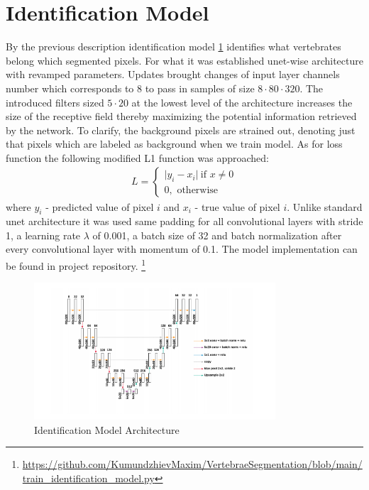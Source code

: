 \section{Identification Model}
By the previous description identification model \ref{fig:identification_model} identifies what vertebrates belong which segmented pixels. For what it was established unet-wise architecture with revamped parameters. Updates brought changes of input layer channels number which corresponds to 8 to pass in samples of size $8 \cdot 80 \cdot 320$. The introduced filters sized $5 \cdot 20$ at the lowest level of the architecture  increases the size of the receptive field thereby maximizing the potential information retrieved by the network. To clarify, the background pixels are strained out, denoting just that pixels which are labeled as background when we train model. As for loss function the following modified L1 function was approached:
\begin{align*}
 L = \begin{cases} \lvert y_i - x_i \rvert\ \mbox{if } x\mbox{$\neq 0$} \\ 0, \mbox{ otherwise} \end{cases}
\end{align*}
where $y_i$ - predicted value of pixel $i$ and $x_i$ - true value of pixel $i$.
Unlike standard unet architecture it was used same padding for all convolutional layers with stride 1, a learning rate
$\lambda$ of 0.001, a batch size of 32 and batch normalization after every convolutional layer with momentum of 0.1. The model implementation can be found in project repository. \footnote{\url{https://github.com/KumundzhievMaxim/VertebraeSegmentation/blob/main/train_identification_model.py}}

\begin{figure}[h]
    \centering \includegraphics[width=9cm]{images/identification_model.png}
    \caption {Identification Model Architecture}
    \label{fig:identification_model}
\end{figure}

